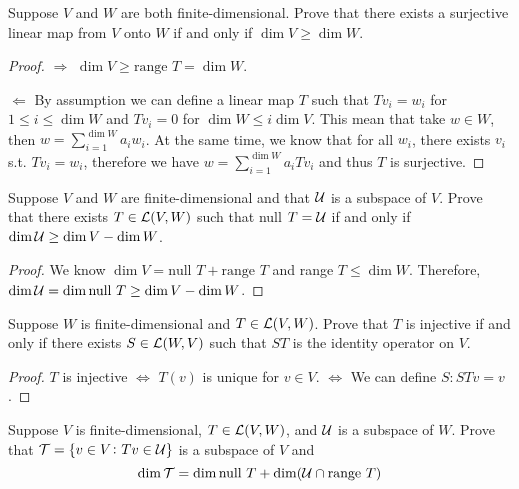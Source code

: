 \documentclass{extarticle}
\begin{document}
\begin{problem}{17}
    Suppose \(V\) and \(W\) are both finite-dimensional. Prove that there exists 
    a surjective linear map from \(V\) onto \(W\) if and only if \(\dim V \geq \dim W\).
\end{problem}

\begin{proof}
\(\Rightarrow\) \(\dim V \geq \text{range } T = \dim W\). 

\(\Leftarrow\) By assumption we can define a linear map \(T\) such that 
\(T v_i = w_i\) for \( 1 \leq i \leq \dim W\) and \(T v_i = 0\) for \(\dim W \leq i \dim V\). 
This mean that take \(w \in W\), then \(w = \sum_{i=1}^{\dim W}a_i w_i\). At the 
same time, we know that for all \(w_i\), there exists \(v_i\) s.t. \(T v_i = w_i\), 
therefore we have \(w = \sum_{i=1}^{\dim W} a_i Tv_i\) and thus \(T\) is surjective.   
\end{proof}

\begin{problem}{18}
    Suppose \(V\) and \(W\) are finite-dimensional and that \(\mathcal{U}\) is a 
    subspace of \(V\). Prove that there exists \(T \in \mathcal{L}(V, W)\) such 
    that null \(T = \mathcal{U}\) if and only if \(\dim \mathcal{U} \geq \dim V - \dim W\). 
\end{problem}

\begin{proof}
We know \(\dim V = \text{null } T + \text{range } T\) and range \(T \leq \dim W\).
Therefore, \(\dim \mathcal{U} = \dim \text{null } T \geq \dim V - \dim W\).  
\end{proof}

\begin{problem}{19}
    Suppose \(W\) is finite-dimensional and \(T \in \mathcal{L}(V, W)\). Prove that 
    \(T\) is injective if and only if there exists \(S \in \mathcal{L}(W, V)\) such that 
    \(ST\) is the identity operator on \(V\).
\end{problem}

\begin{proof}
\(T\) is injective \(\Longleftrightarrow\) \(T(v)\) is unique for \(v \in V\). 
\(\Longleftrightarrow\) We can define \(S \colon S Tv = v\). 
\end{proof}

\begin{problem}{21}
    Suppose \(V\) is finite-dimensional, \(T \in \mathcal{L}(V, W)\), and \(\mathcal{U}\) is 
    a subspace of \(W\). Prove that \(\mathcal{T} =  \{ v \in V \colon Tv \in \mathcal{U} \}\) is a subspace 
    of \(V\) and 
    \[\dim \mathcal{T} = \dim \text{null } T + \dim (\mathcal{U} \cap \text{range } T)\]
\end{problem}
\end{document}
